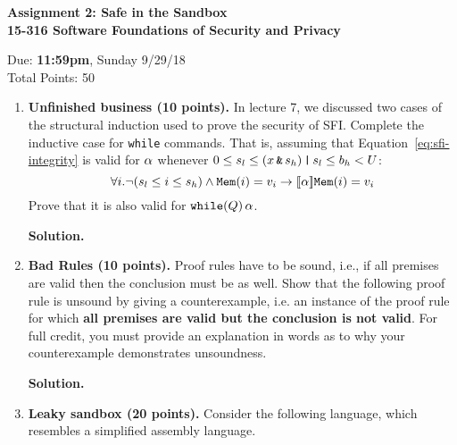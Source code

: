 \documentclass[10pt]{article}
\begin{document}
\begin{center}
\textbf{ Assignment 2: Safe in the Sandbox\\15-316 Software Foundations of Security and Privacy}\\
\end{center}
Due: \textbf{ 11:59pm}, Sunday 9/29/18 \\
Total Points: 50

\vspace{-5mm}

\begin{enumerate}
\item \textbf{Unfinished business (10 points).} In lecture 7, we discussed two cases of the structural induction used to prove the security of SFI. Complete the inductive case for \texttt{while} commands. That is, assuming that Equation~\ref{eq:sfi-integrity} is valid for $\alpha$ whenever $0 \le s_l \le  (x \operatorname{\texttt{\upshape \&}} s_h) \operatorname{\texttt{\upshape |}} s_l \le b_h < U$:
\begin{equation}
\label{eq:sfi-integrity}
\forall i . \lnot(s_l \le i \le s_h)  \land \pderef{i}=v_i \limply \dbox{\asprg}{\pderef{i}=v_i}
\end{equation}
Prove that it is also valid for $\texttt{\upshape while}(Q)\,\alpha$.

\textbf{Solution.}



\newpage

\item \textbf{Bad Rules (10 points).}
Proof rules have to be sound, i.e., if all premises are valid then the conclusion must be as well.
Show that the following proof rule is unsound by giving a counterexample, i.e. an instance of
the proof rule for which \textbf{all premises are valid but the conclusion is not valid}.
For full credit, you must provide an explanation in words as to why your counterexample demonstrates unsoundness.

{\linferenceRule[sequent] {
  \lsequent{\Gamma}{\dbox{\asprg}{\busfml}}
  &\lsequent{\Gamma,\busfml}{\dbox{\bsprg}{\ausfml}}
  } {
    \lsequent{\Gamma}{\dbox{\asprg;\bsprg}{\ausfml}}
  }
}{}

\textbf{Solution.}



\newpage

\item \textbf{Leaky sandbox (20 points).}
Consider the following language, which resembles a simplified assembly language.


\end{enumerate}
\end{document}
